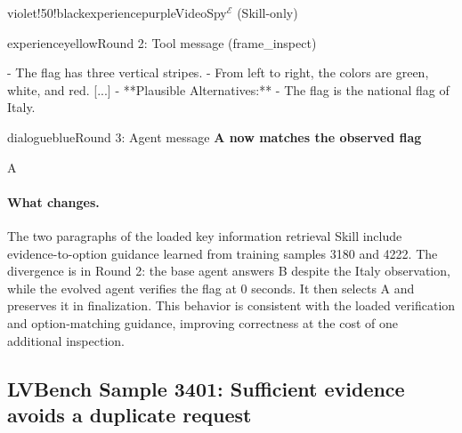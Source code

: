 \begin{ExecutionBox}{violet!50!black}{experiencepurple}{VideoSpy$^{\mathcal{E}}$ (Skill-only)}
\begin{MessageBox}{experienceyellow}{Round 2: Tool message (frame\_inspect)}
\begin{Trajectory}
[...]     - The flag has three vertical stripes.
    - From left to right, the colors are green, white, and red.
[...] - **Plausible Alternatives:** - The flag is the national flag of Italy.
\end{Trajectory}
\end{MessageBox}
\begin{MessageBox}[agent message,frame hidden,borderline={1pt}{0pt}{changeaccent,dash pattern=on 3pt off 2pt},colbacktitle=red!4]{dialogueblue}{Round 3: Agent message}
\noindent\textcolor{changeaccent}{\textbf{A now matches the observed flag}}\par
\begin{Trajectory}
A
\end{Trajectory}
\end{MessageBox}
\end{ExecutionBox}


\paragraph{What changes.}
The two paragraphs of the loaded key information retrieval Skill include evidence-to-option guidance learned from training samples 3180 and 4222. The divergence is in Round 2: the base agent answers B despite the Italy observation, while the evolved agent verifies the flag at 0 seconds. It then selects A and preserves it in finalization. This behavior is consistent with the loaded verification and option-matching guidance, improving correctness at the cost of one additional inspection.

\bigskip
\subsection{LVBench Sample 3401: Sufficient evidence avoids a duplicate request}
\label{app:style_case}

